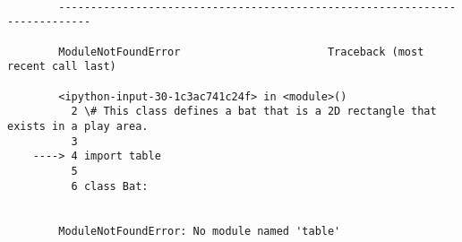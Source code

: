 \documentclass[11pt]{article}
\begin{document}
    \begin{Verbatim}[commandchars=\\\{\}]

        ---------------------------------------------------------------------------

        ModuleNotFoundError                       Traceback (most recent call last)

        <ipython-input-30-1c3ac741c24f> in <module>()
          2 \# This class defines a bat that is a 2D rectangle that exists in a play area.
          3 
    ----> 4 import table
          5 
          6 class Bat:
    

        ModuleNotFoundError: No module named 'table'

    \end{Verbatim}
\end{document}
